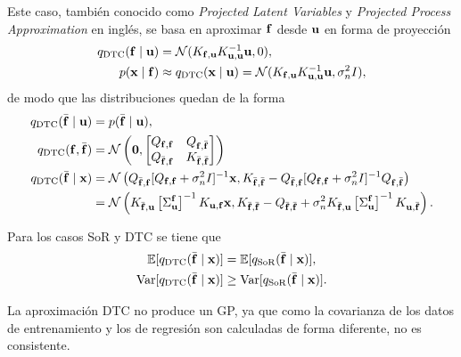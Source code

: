 Este caso, también conocido como \emph{Projected Latent Variables} y \emph{Projected Process Approximation} en inglés, se basa en aproximar \(\mathbf{f}\) desde \(\mathbf{u}\) en forma de proyección
\begin{align*}
	q_{\mathrm{DTC}}(\mathbf{f} \mid \mathbf{u})	&= \mathcal{N}(K_{\mathbf{f}, \mathbf{u}} K_{\mathbf{u}, \mathbf{u}}^{-1} \mathbf{u}, 0), \\
	p(\mathbf{x} \mid \mathbf{f})					&\approx q_{\mathrm{DTC}}(\mathbf{x} \mid \mathbf{u}) = \mathcal{N}(K_{\mathbf{f}, \mathbf{u}} K_{\mathbf{u}, \mathbf{u}}^{-1} \mathbf{u}, \sigma_n^2 I),
\end{align*}
de modo que las distribuciones quedan de la forma
\begin{align*}
	q_{\mathrm{DTC}}(\bar{\mathbf{f}} \mid \mathbf{u})	&= p(\bar{\mathbf{f}} \mid \mathbf{u}), \\
	q_{\mathrm{DTC}}(\mathbf{f}, \bar{\mathbf{f}})		&= \mathcal{N}\left(\mathbf{0}, \begin{bmatrix}
		Q_{\mathbf{f}, \mathbf{f}} & Q_{\mathbf{f}, \bar{\mathbf{f}}} \\
		Q_{\bar{\mathbf{f}}, \mathbf{f}} & K_{\bar{\mathbf{f}}, \bar{\mathbf{f}}}
	\end{bmatrix}
	\right) \\
	q_{\mathrm{DTC}}(\bar{\mathbf{f}} \mid \mathbf{x})	&= \mathcal{N}\left(Q_{\bar{\mathbf{f}}, \mathbf{f}} [Q_{\mathbf{f}, \mathbf{f}} + \sigma_n^2 I]^{-1} \mathbf{x}, K_{\bar{\mathbf{f}}, \bar{\mathbf{f}}} - Q_{\bar{\mathbf{f}}, \mathbf{f}}[Q_{\mathbf{f}, \mathbf{f}} + \sigma_n^2 I]^{-1} Q_{\mathbf{f}, \bar{\mathbf{f}}}\right) \\
											&= \mathcal{N}\left(K_{\bar{\mathbf{f}}, \mathbf{u}} \left[\Sigma_{\mathbf{u}}^{\mathbf{f}}\right]^{-1} K_{\mathbf{u}, \mathbf{f}} \mathbf{x}, K_{\bar{\mathbf{f}}, \bar{\mathbf{f}}} - Q_{\bar{\mathbf{f}}, \bar{\mathbf{f}}} + \sigma_n^2 K_{\bar{\mathbf{f}}, \mathbf{u}} \left[\Sigma_{\mathbf{u}}^{\mathbf{f}}\right]^{-1} K_{\mathbf{u}, \bar{\mathbf{f}}}\right).
\end{align*}

\begin{proposition}
	Para los casos SoR y DTC se tiene que
	\begin{align*}
		\mathbb{E}[q_{\mathrm{DTC}}(\bar{\mathbf{f}} \mid \mathbf{x})]		&= \mathbb{E}[q_{\mathrm{SoR}}(\bar{\mathbf{f}} \mid \mathbf{x})],\\
		\operatorname{Var}[q_{\mathrm{DTC}}(\bar{\mathbf{f}} \mid \mathbf{x})]	&\geq \operatorname{Var}[q_{\mathrm{SoR}}(\bar{\mathbf{f}} \mid \mathbf{x})].
	\end{align*}
\end{proposition}

\begin{proposition}
	La aproximación DTC no produce un GP, ya que como la covarianza de los datos de entrenamiento y los de regresión son calculadas de forma diferente, no es consistente.
\end{proposition}

